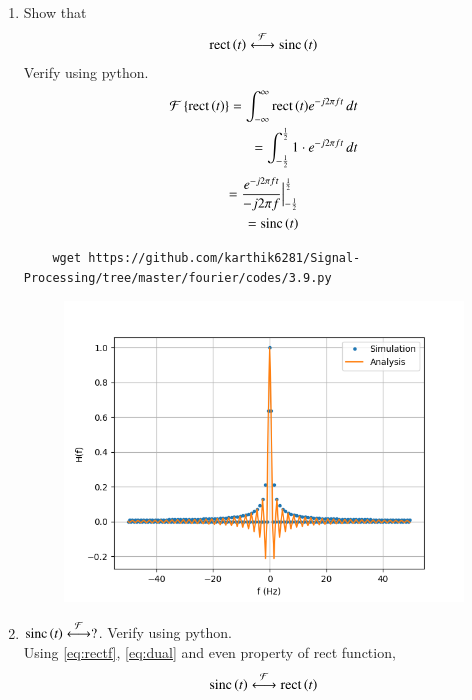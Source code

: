 \documentclass[journal,12pt,twocolumn]{IEEEtran}
\renewcommand\thesection{\arabic{section}}
\begin{document}
\begin{enumerate}[label=\thesection.\arabic*
,ref=\thesection.\theenumi]
\begin{figure}[!ht]
    \caption{}
\end{figure}
 \item Show that 
 \begin{align}
	 \text{rect}\left(t\right) \overset{\mathcal{F}}{ \longleftrightarrow} \text{sinc}\left(t\right)
 \end{align}
 Verify using python.\\
 \solution
 \begin{align}
  \mathcal{F}\left\{\text{rect}\left(t\right)\right\}=\int_{-\infty}^{\infty}{\text{rect}\left(t\right)}e^{-j2\pi ft}\,dt\\
  =\int_{-\frac{1}{2}}^{\frac{1}{2}}1\cdot e^{-j2\pi ft}\,dt
\end{align}
\begin{align}
  =\frac{e^{-j2\pi ft}}{-j2\pi f}\Big |_{-\frac{1}{2}}^{\frac{1}{2}}\\
 \label{eq:rectf}
  =\text{sinc}\left(t\right)
  \end{align}
  \begin{lstlisting}
    wget https://github.com/karthik6281/Signal-Processing/tree/master/fourier/codes/3.9.py 
  \end{lstlisting}
  \begin{figure}[!ht]
    \centering
    \includegraphics[width=\columnwidth]{./figs/3.9}
    \caption{}
\end{figure}
 \item 
$	 \text{sinc}\left(t\right)\overset{\mathcal{F}}{ \longleftrightarrow} ?$.  Verify using python.\\
\solution
Using \eqref{eq:rectf}, \eqref{eq:dual} and even property of rect function,
\begin{align}
\label{eq:sinc}
\text{sinc}\left(t\right)\overset{\mathcal{F}}{ \longleftrightarrow}\text{rect}\left(t\right)
\end{align}

\end{enumerate}
\end{document}
